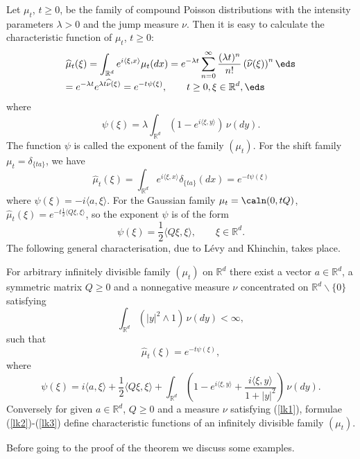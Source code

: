 \documentclass[preprint]{imsart}
\def\R{\mathbb R}
\def\ds{\displaystyle}
\begin{document}
{Let $\mu_t$, $t\geq 0$, be the family of compound
Poisson distributions with the intensity parameters $\lambda >0$
and the jump measure $\nu$.
Then it is easy to calculate the
characteristic function of $\mu_t$, $t\geq 0$:
$$
  \begin{array}{l}\ds
    \widehat{\mu}_t(\xi)=\int_{\R^d}e^{i\langle \xi,x\rangle}
    \mu_t(dx) =  e^{-\lambda t}\sum_{n=0}^\infty
    \frac{(\lambda t)^n}{n!}\left( \widehat{\nu}(\xi)\right)^n
    \eds \\\ds
    = e^{-\lambda t}e^{\lambda t\widehat{\nu}(\xi)}
    =e^{-  t\psi (\xi)},\qquad t\geq 0,\xi\in\R^d,
    \eds
  \end{array}
$$
where
$$
\psi(\xi)= \lambda\int_{\R^d}
\left(1-e^{i\langle \xi,y\rangle}\right)\, \nu(dy).
$$
The function $\psi$ is called the exponent of the
family $(\mu_t)$. For the shift family
$\mu_t=\delta_{\{ta\}}$, we have
$$
\widehat{\mu}_t(\xi) =\int_{\R^d}
e^{i\langle \xi,x\rangle}\delta_{\{ta\}}(dx)
=e^{-  t\psi (\xi)}
$$
where $  \psi (\xi)=-i\langle a,\xi\rangle$. For the
Gaussian family $\mu_t=\caln (0,tQ)$,
$\widehat{\mu}_t(\xi)
=e^{-  t\frac{1}{2}\langle Q\xi ,\xi\rangle}$,
so the exponent $\psi$ is of the form
$$
\psi(\xi)=\frac{1}{2}\langle Q\xi ,\xi\rangle,
\qquad \xi\in\R^d.
$$
The following general characterisation, due to L\'evy
and Khinchin,  takes place.

\begin{Theorem}
For arbitrary infinitely divisible family $(\mu_t)$ on
$\R^d$ there exist a vector $a\in\R^d$, a symmetric matrix  $Q\geq 0$
and a nonnegative measure $\nu$ concentrated on
$\R^d\backslash \{ 0\}$  satisfying
\begin{equation}\label{lk1}
\int_{\R^d}\left(|y|^2\wedge 1\right)\, \nu(dy)<\infty,
\end{equation}
such that
\begin{equation}\label{lk2}
\widehat{\mu}_t(\xi)=e^{-t\psi(\xi)},
\end{equation}
where
\begin{equation}\label{lk3}
\psi(\xi)=i\langle a,\xi\rangle
+\frac{1}{2}\langle Q\xi ,\xi\rangle +
\int_{\R^d}\left(1-e^{i\langle \xi,y\rangle}+
\frac{i\langle \xi,y\rangle}{1+|y|^2}\right)\,
\nu(dy).
\end{equation}
Conversely for given $a\in\R^d$, $Q\geq 0$   and a
 measure $\nu$  satisfying (\ref{lk1}), formulae
(\ref{lk2})-(\ref{lk3}) define characteristic functions
of an infinitely divisible family $(\mu_t)$.
\end{Theorem}
Before going to the proof of the theorem we discuss some examples.

}
\end{document}
